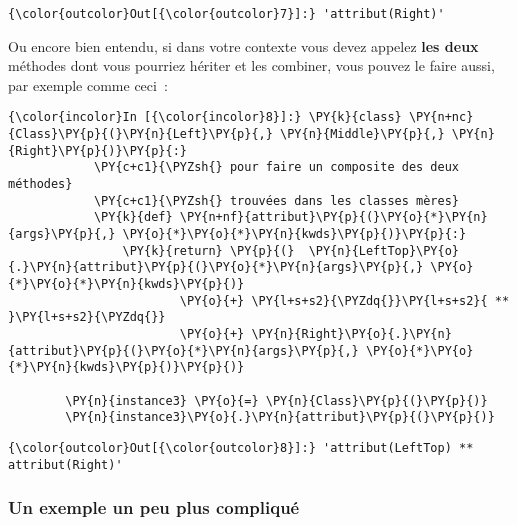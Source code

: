 \begin{Verbatim}[commandchars=\\\{\},frame=single,framerule=0.3mm,rulecolor=\color{cellframecolor}]
{\color{outcolor}Out[{\color{outcolor}7}]:} 'attribut(Right)'
\end{Verbatim}
            
    Ou encore bien entendu, si dans votre contexte vous devez appelez
\textbf{les deux} méthodes dont vous pourriez hériter et les combiner,
vous pouvez le faire aussi, par exemple comme ceci~:

    \begin{Verbatim}[commandchars=\\\{\},frame=single,framerule=0.3mm,rulecolor=\color{cellframecolor}]
{\color{incolor}In [{\color{incolor}8}]:} \PY{k}{class} \PY{n+nc}{Class}\PY{p}{(}\PY{n}{Left}\PY{p}{,} \PY{n}{Middle}\PY{p}{,} \PY{n}{Right}\PY{p}{)}\PY{p}{:}
            \PY{c+c1}{\PYZsh{} pour faire un composite des deux méthodes}
            \PY{c+c1}{\PYZsh{} trouvées dans les classes mères}
            \PY{k}{def} \PY{n+nf}{attribut}\PY{p}{(}\PY{o}{*}\PY{n}{args}\PY{p}{,} \PY{o}{*}\PY{o}{*}\PY{n}{kwds}\PY{p}{)}\PY{p}{:}
                \PY{k}{return} \PY{p}{(}  \PY{n}{LeftTop}\PY{o}{.}\PY{n}{attribut}\PY{p}{(}\PY{o}{*}\PY{n}{args}\PY{p}{,} \PY{o}{*}\PY{o}{*}\PY{n}{kwds}\PY{p}{)} 
                        \PY{o}{+} \PY{l+s+s2}{\PYZdq{}}\PY{l+s+s2}{ ** }\PY{l+s+s2}{\PYZdq{}} 
                        \PY{o}{+} \PY{n}{Right}\PY{o}{.}\PY{n}{attribut}\PY{p}{(}\PY{o}{*}\PY{n}{args}\PY{p}{,} \PY{o}{*}\PY{o}{*}\PY{n}{kwds}\PY{p}{)}\PY{p}{)}
            
        \PY{n}{instance3} \PY{o}{=} \PY{n}{Class}\PY{p}{(}\PY{p}{)}
        \PY{n}{instance3}\PY{o}{.}\PY{n}{attribut}\PY{p}{(}\PY{p}{)}
\end{Verbatim}


\begin{Verbatim}[commandchars=\\\{\},frame=single,framerule=0.3mm,rulecolor=\color{cellframecolor}]
{\color{outcolor}Out[{\color{outcolor}8}]:} 'attribut(LeftTop) ** attribut(Right)'
\end{Verbatim}
            
    \hypertarget{un-exemple-un-peu-plus-compliquuxe9}{%
\subsubsection{Un exemple un peu plus
compliqué}\label{un-exemple-un-peu-plus-compliquuxe9}}

